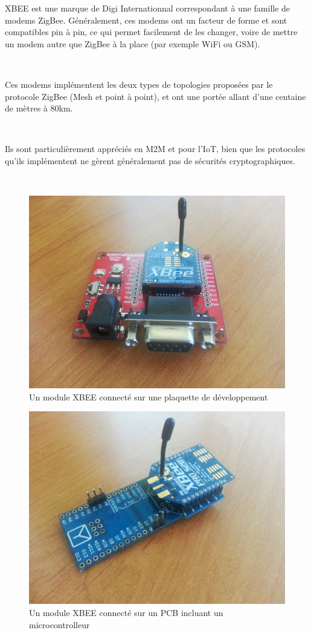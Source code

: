 \documentclass{article}
\begin{document}
XBEE est une marque de Digi Internationnal correspondant à une famille de modems ZigBee. Généralement, ces modems ont un facteur de forme et sont compatibles pin à pin, ce qui permet facilement de les changer, voire de mettre un modem autre que ZigBee à la place (par exemple WiFi ou GSM).

~

Ces modems implémentent les deux types de topologies proposées par le protocole ZigBee (Mesh et point à point), et ont une portée allant d’une centaine de mètres à 80km.

~

Ils sont particulièrement appréciés en M2M et pour l’IoT, bien que les protocoles qu’ils implémentent ne gèrent généralement pas de sécurités cryptographiques.

~

\begin{figure}[h!]
    \centering\includegraphics[width=\linewidth*2/3]{img/xbee.jpg}
    \caption{Un module XBEE connecté sur une plaquette de développement}
\end{figure}

\begin{figure}[h!]
    \centering\includegraphics[width=\linewidth*2/3]{img/xbee_2.jpg}
    \caption{Un module XBEE connecté sur un PCB incluant un microcontrolleur}
\end{figure}
\end{document}
